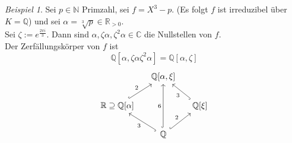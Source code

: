 \documentclass[10pt,a4paper]{article}
\newcommand{\N}{\ensuremath{\mathbb{N}}}
\newcommand{\Q}{\ensuremath{\mathbb{Q}}}
\newcommand{\R}{\ensuremath{\mathbb{R}}}
\newcommand{\C}{\ensuremath{\mathbb{C}}}
\newcommand{\al}{\ensuremath{\alpha}}
\newcounter{thm}[section]
\theoremstyle{definition}
\theoremstyle{plain}
\theoremstyle{remark}
\newtheorem{exm}[thm]{Beispiel}
\begin{document}
\begin{exm}
	Sei $p\in\N$ Primzahl, sei $f=X^3-p$. (Es folgt $f$ ist irreduzibel über $K=\Q$) und sei $\al=\sqrt[3]{p}\in\R_{>0}$.\\
	Sei $\zeta:=e^{\frac{2\pi i}{3}}$. Dann sind $\al,\zeta\al,\zeta^2\al\in\C$ die Nullstellen von $f$.\\
	Der Zerfällungskörper von $f$ ist
	\[\Q[\al,\zeta\al\zeta^2\al]=\Q[\al,\zeta]\]
	\[\begin{tikzcd}[column sep=small]
		&\Q[\al,\xi]&\\
		\R\supseteq \Q[\al] \ar[ur,hook,"2"] && \Q[\xi] \ar[ul,hook,"3"]\\
		& \Q \ar[ul,hook,"3"] \ar[uu,hook,"6"] \ar[ur,hook,"2"] &
	\end{tikzcd}\] 
\end{exm}

\end{document}
